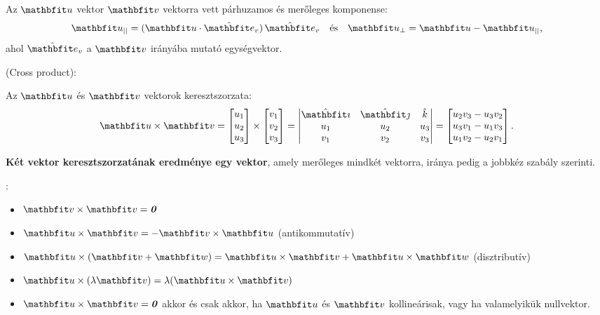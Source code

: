 \documentclass[a4paper, 12pt]{scrartcl}
\begin{document}
\begin{blueBox}

  Az $\rvec u$ vektor $\rvec v$ vektorra vett párhuzamos és merőleges
  komponense:
  \[
    \rvec u_{||} = (\rvec u \cdot \uvec e_v) \, \uvec e_v
    \quad \text{és} \quad
    \rvec u_{\perp} = \rvec u - \rvec u_{||}
    \text,
  \]
  ahol $\uvec e_v$ a $\rvec v$ irányába mutató egységvektor.
\end{blueBox}

\begin{blueBox}
   (Cross product):

  Az $\rvec u$ és $\rvec v$ vektorok keresztszorzata:
  \[
    \rvec u \times \rvec v
    = \begin{bmatrix}
      u_1 \\ u_2 \\ u_3
    \end{bmatrix} \times \begin{bmatrix}
      v_1 \\ v_2 \\ v_3
    \end{bmatrix}
    = \left|\begin{matrix}
      \ibase & \jbase & \kbase \\
      u_1    & u_2    & u_3    \\
      v_1    & v_2    & v_3
    \end{matrix}\right|
    = \begin{bmatrix}
      u_2 v_3 - u_3 v_2 \\
      u_3 v_1 - u_1 v_3 \\
      u_1 v_2 - u_2 v_1
    \end{bmatrix}
    \text.
  \]

  \textbf{Két vektor keresztszorzatának eredménye egy vektor}, amely merőleges
  mindkét vektorra, iránya pedig a jobbkéz szabály szerinti.
\end{blueBox}

\begin{note}
  :
  \begin{itemize}
    \item $\rvec v \times \rvec v = \nvec$

    \item $\rvec u \times \rvec v = -\rvec v \times \rvec u$
          (antikommutatív)

    \item $\rvec u \times (\rvec v + \rvec w)
            = \rvec u \times \rvec v + \rvec u \times \rvec w$
          (disztributív)

    \item $\rvec u \times (\lambda \rvec v) = \lambda (\rvec u \times \rvec v)$

    \item $\rvec u \times \rvec v = \nvec$ akkor és csak akkor, ha $\rvec u$ és
          $\rvec v$ kollineárisak, vagy ha valamelyikük nullvektor.
  \end{itemize}
\end{note}
\end{document}
